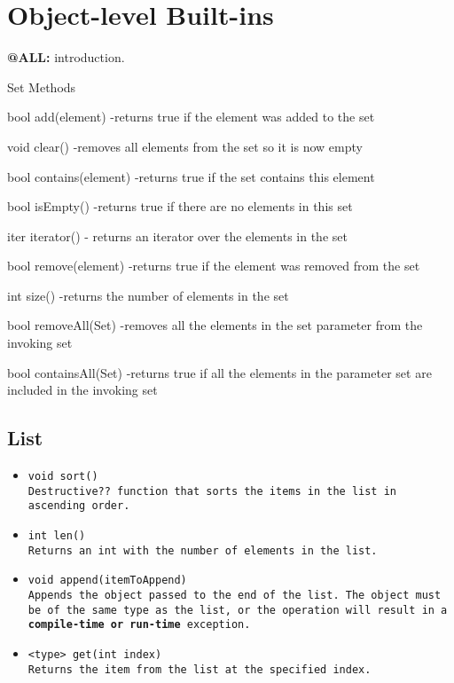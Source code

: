 \documentclass{book}
\begin{document}

\section{Object-level Built-ins} %
\label{sec:object_level_built_ins}

\textbf{@ALL:} introduction.

Set Methods

bool add(element)
-returns true if the element was added to the set

void clear()
-removes all elements from the set so it is now empty

bool contains(element)
-returns true if the set contains this element

bool isEmpty()
-returns true if there are no elements in this set

iter iterator()
- returns an iterator over the elements in the set

bool remove(element)
-returns true if the element was removed from the set

int size()
-returns the number of elements in the set

bool removeAll(Set) 
-removes all the elements in the set parameter from the invoking set

bool containsAll(Set) 
-returns true if all the elements in the parameter set are included in the invoking set

\subsection{List} %
\label{sub:list}

\begin{itemize}

\item \tt void sort() \rm \\

Destructive?? function that sorts the items in the list in ascending order.

\item \tt int len() \rm \\

Returns an int with the number of elements in the list.

\item \tt void append(itemToAppend) \rm \\

Appends the object passed to the end of the list. The object must be of the same
type as the list, or the operation will result in a \textbf{compile-time or
run-time} exception.

\item \tt <type> get(int index) \rm \\

Returns the item from the list at the specified index.

\end{itemize}
\end{document}
